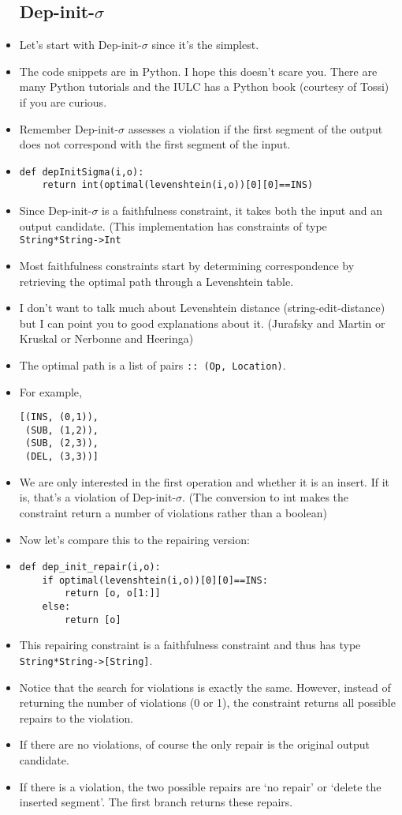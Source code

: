 \documentclass{article}[11pt]
\begin{document}
\begin{itemize}
\subsection{Dep-init-$\sigma$}
\item Let's start with Dep-init-$\sigma$ since it's the simplest.
\item The code snippets are in Python. I hope this doesn't scare
  you. There are many Python tutorials and the IULC has a Python book
  (courtesy of Tossi) if you are curious.
\item Remember Dep-init-$\sigma$ assesses a violation if the first segment of
  the output does not correspond with the first segment of the input.
\item 
\begin{verbatim}
def depInitSigma(i,o):
    return int(optimal(levenshtein(i,o))[0][0]==INS)
\end{verbatim}
\item Since Dep-init-$\sigma$ is a faithfulness constraint, it takes both the input
  and an output candidate. (This implementation has constraints of type
  \verb+String*String->Int+
\item Most faithfulness constraints start by determining
  correspondence by retrieving the optimal path through a Levenshtein table.
\item I don't want to talk much about Levenshtein distance
  (string-edit-distance) but I can point you to good explanations
  about it. (Jurafsky and Martin or Kruskal or Nerbonne and Heeringa)
\item The optimal path is a list of pairs \verb+:: (Op, Location)+.
\item For example,
\begin{verbatim}
[(INS, (0,1)),
 (SUB, (1,2)),
 (SUB, (2,3)),
 (DEL, (3,3))]
\end{verbatim}
\item We
  are only interested in the first operation and whether it is an
  insert. If it is, that's a violation of Dep-init-$\sigma$. (The
  conversion to int makes the constraint return a number of violations
  rather than a boolean)
\item Now let's compare this to the repairing version:
\item
\begin{verbatim}
def dep_init_repair(i,o):
    if optimal(levenshtein(i,o))[0][0]==INS:
        return [o, o[1:]]
    else:
        return [o]
\end{verbatim}
\item This repairing constraint is a faithfulness constraint and thus has type
  \verb+String*String->[String]+.
\item Notice that the search for violations is exactly the same. However, instead of
  returning the number of violations (0 or 1), the constraint returns all possible
  repairs to the violation.
\item If there are no violations, of course the only repair is the original output
  candidate.
\item If there is a violation, the two possible repairs are `no repair' or `delete
  the inserted segment'. The first branch returns these repairs.

\end{itemize}
\end{document}
